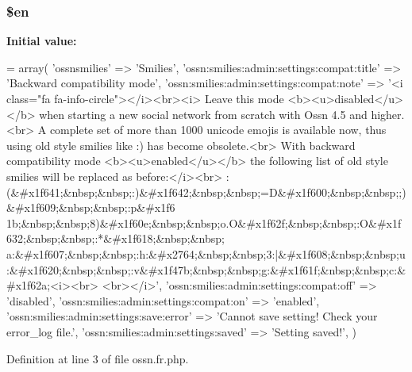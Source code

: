 \subsubsection[{\texorpdfstring{\$en}{$en}}]{\setlength{\rightskip}{0pt plus 5cm}\$en}\hypertarget{components_2_ossn_smilies_2locale_2ossn_8fr_8php_a48abc714dfb71c8fffa83cf49f452115}{}\label{components_2_ossn_smilies_2locale_2ossn_8fr_8php_a48abc714dfb71c8fffa83cf49f452115}
{\bfseries Initial value\+:}
\begin{DoxyCode}
= array(
        \textcolor{stringliteral}{'ossnsmilies'} => \textcolor{stringliteral}{'Smilies'},
        \textcolor{stringliteral}{'ossn:smilies:admin:settings:compat:title'} => \textcolor{stringliteral}{'Backward compatibility mode'},
        \textcolor{stringliteral}{'ossn:smilies:admin:settings:compat:note'} => \textcolor{stringliteral}{'<i class="fa fa-info-circle"></i><br><i>}
\textcolor{stringliteral}{        Leave this mode <b><u>disabled</u></b> when starting a new social network from scratch with Ossn
       4.5 and higher.<br>}
\textcolor{stringliteral}{        A complete set of more than 1000 unicode emojis is available now, thus using old style smilies like
       :) has become obsolete.<br>}
\textcolor{stringliteral}{        With backward compatibility mode <b><u>enabled</u></b> the following list of old style smilies will
       be replaced as before:</i><br>}
\textcolor{stringliteral}{        
      :(&#x1f641;&nbsp;&nbsp;:)&#x1f642;&nbsp;&nbsp;=D&#x1f600;&nbsp;&nbsp;;)&#x1f609;&nbsp;&nbsp;:p&#x1f6
      1b;&nbsp;&nbsp;8)&#x1f60e;&nbsp;&nbsp;o.O&#x1f62f;&nbsp;&nbsp;:O&#x1f632;&nbsp;&nbsp;:*&#x1f618;&nbsp;&nbsp;
      a:&#x1f607;&nbsp;&nbsp;:h:&#x2764;&nbsp;&nbsp;3:|&#x1f608;&nbsp;&nbsp;u:&#x1f620;&nbsp;&nbsp;:v&#x1f47b;&nbsp;&nbsp;g:&#x1f61f;&nbsp;&nbsp;c:&#x1f62a;<i><br>}
\textcolor{stringliteral}{        <br></i>'},
        \textcolor{stringliteral}{'ossn:smilies:admin:settings:compat:off'} => \textcolor{stringliteral}{'disabled'},
        \textcolor{stringliteral}{'ossn:smilies:admin:settings:compat:on'} => \textcolor{stringliteral}{'enabled'},
        \textcolor{stringliteral}{'ossn:smilies:admin:settings:save:error'} => \textcolor{stringliteral}{'Cannot save setting! Check your error\_log file.'},
        \textcolor{stringliteral}{'ossn:smilies:admin:settings:saved'} => \textcolor{stringliteral}{'Setting saved!'},
)
\end{DoxyCode}


Definition at line 3 of file ossn.\+fr.\+php.

